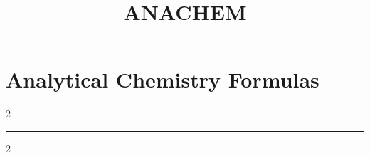 \documentclass[8pt]{extarticle}
\title{ANACHEM}
\begin{document}
\section*{Analytical Chemistry Formulas}

\begin{multicols}{2}




\end{multicols}
\hrule

\begin{multicols}{2}


\end{multicols}
\end{document}
